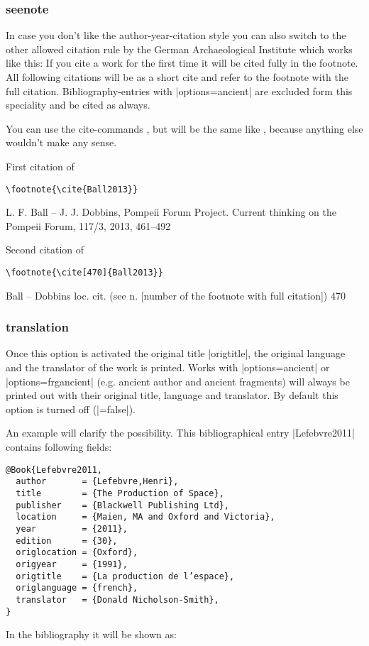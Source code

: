 \documentclass[a4paper,
10pt,
greek,
french,
spanish,
italian,
ngerman,
english
]{ltxdoc}
\begin{document}
\subsubsection{seenote}\label{seenote}
In case you don’t like the  author-year-citation style you can also switch to the other allowed citation rule by the German Archaeological Institute
which works like this:
If you cite a work for the first time it will be cited fully in the footnote.
All following citations will be as a short cite and refer to the footnote with the full citation.
Bibliography-entries with |options={ancient}| are excluded form this speciality and be cited as always.

You can use the cite-commands ,  but    will be the same like , because anything else wouldn’t make any sense.

First citation of 
\begin{lstlisting}
\footnote{\cite{Ball2013}}
\end{lstlisting}

 \begin{bsp}
L. F. Ball – J. J. Dobbins, Pompeii Forum Project. Current thinking on the Pompeii Forum, 117/3, 2013, 461–492
 \end{bsp}

Second citation of
\begin{lstlisting}
\footnote{\cite[470]{Ball2013}}
\end{lstlisting}
 \begin{bsp}
Ball – Dobbins loc. cit. (see n. [number of the footnote with full citation]) 470
 \end{bsp}

\subsubsection{translation}\label{translation}
Once this option is activated the original title |origtitle|, the original language and the translator of the work is printed.
Works with |options={ancient}| or |options={frgancient}| 
(e.g. ancient author and ancient fragments) will always be printed out with their original title, language and translator.
By default this option is turned off (|=false|). 

An example will  clarify the possibility.
This bibliographical entry |Lefebvre2011| contains following fields:
 \begin{lstlisting}[style=bibentry,label=Lefebvre2011,caption={{@}Book\{Lefebvre2011,…\} }]
@Book{Lefebvre2011,
  author       = {Lefebvre,Henri},
  title        = {The Production of Space},
  publisher    = {Blackwell Publishing Ltd},
  location     = {Maien, MA and Oxford and Victoria},
  year         = {2011},
  edition      = {30},
  origlocation = {Oxford},
  origyear     = {1991},
  origtitle    = {La production de l’espace},
  origlanguage = {french},
  translator   = {Donald Nicholson-Smith},
}
\end{lstlisting}
In the bibliography it will be shown as:
\end{document}
